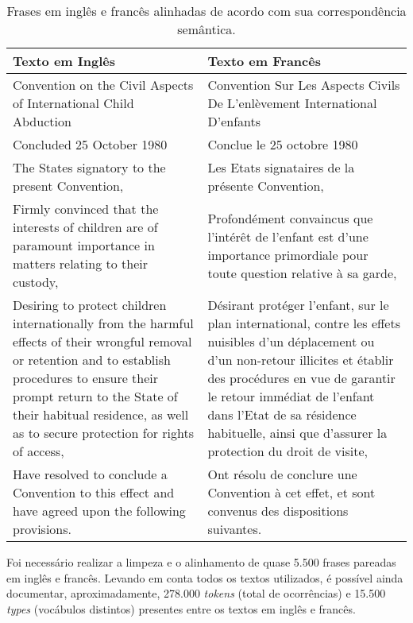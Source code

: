 \documentclass[portuguese]{textolivre}
\begin{document}
\begin{table}[!htpb]
\centering
\begin{threeparttable}
\caption{Frases em inglês e francês alinhadas de acordo com sua correspondência semântica.}
\label{tab-01}
\begin{tabular}{p{6cm}p{6cm}}
\toprule
Texto em Inglês & Texto em Francês\\
\midrule
\foreignlanguage{english}{Convention on the Civil Aspects of International Child Abduction} &
Convention Sur Les Aspects Civils De L'enlèvement International D'enfants\\
Concluded 25 October 1980 &
Conclue le 25 octobre 1980\\
The States signatory to the present Convention, &
Les Etats signataires de la présente Convention,\\
Firmly convinced that the interests of children are of paramount importance in matters relating to their custody, &
Profondément convaincus que l'intérêt de l'enfant est d'une importance primordiale pour toute question relative à sa garde,\\
Desiring to protect children internationally from the harmful effects of their wrongful removal or retention and to establish procedures to ensure their prompt return to the State of their habitual residence, as well as to secure protection for rights of access, &
Désirant protéger l'enfant, sur le plan international, contre les effets nuisibles d'un déplacement ou d'un non-retour illicites et établir des procédures en vue de garantir le retour immédiat de l'enfant dans l'Etat de sa résidence habituelle, ainsi que d'assurer la protection du droit de visite,\\
Have resolved to conclude a Convention to this effect and have agreed upon the following provisions. &
Ont résolu de conclure une Convention à cet effet, et sont convenus des dispositions suivantes.\\
\bottomrule
\end{tabular}
\end{threeparttable}
\end{table}	


Foi necessário realizar a limpeza e o alinhamento de quase 5.500 frases pareadas em inglês e francês. Levando em conta todos os textos utilizados, é possível ainda documentar, aproximadamente, 278.000 \textit{tokens} (total de ocorrências) e 15.500 \textit{types} (vocábulos distintos) presentes entre os textos em inglês e francês.
\end{document}
